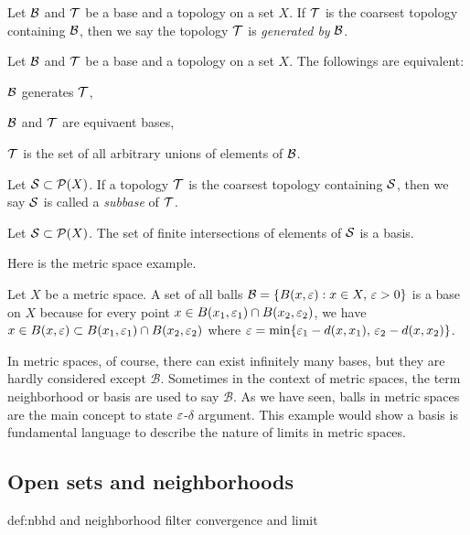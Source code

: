 \documentclass{../crs}
\begin{document}
\begin{defn}
Let $\mathcal{B}$ and $\mathcal{T}$ be a base and a topology on a set $X$.
If $\mathcal{T}$ is the coarsest topology containing $\mathcal{B}$, then we say the topology $\mathcal{T}$ is \emph{generated by} $\mathcal{B}$.
\end{defn}
\begin{thm}
Let $\mathcal{B}$ and $\mathcal{T}$ be a base and a topology on a set $X$.
The followings are equivalent:
\begin{cond}
\item $\mathcal{B}$ generates $\mathcal{T}$,
\item $\mathcal{B}$ and $\mathcal{T}$ are equivaent bases,
\item $\mathcal{T}$ is the set of all arbitrary unions of elements of $\mathcal{B}$.
\end{cond}
\end{thm}

\begin{defn}
Let $\mathcal{S}\subset\mathcal{P}(X)$.
If a topology $\mathcal{T}$ is the coarsest topology containing $\mathcal{S}$, then we say $\mathcal{S}$ is called a \emph{subbase} of $\mathcal{T}$.
\end{defn}
\begin{prop}
Let $\mathcal{S}\subset\mathcal{P}(X)$.
The set of finite intersections of elements of $\mathcal{S}$ is a basis.
\end{prop}

Here is the metric space example.
\begin{ex}
Let $X$ be a metric space.
A set of all balls $\mathcal{B}=\{B(x,\varepsilon):x\in X,\,\varepsilon>0\}$ is a base on $X$ because for every point $x\in B(x_1,\varepsilon_1)\cap B(x_2,\varepsilon_2)$, we have $x\in B(x,\varepsilon)\subset B(x_1,\varepsilon_1)\cap B(x_2,\varepsilon_2)$ where $\varepsilon=\min\{\varepsilon_1-d(x,x_1),\,\varepsilon_2-d(x,x_2)\}$.
\end{ex}

In metric spaces, of course, there can exist infinitely many bases, but they are hardly considered except $\mathcal{B}$.
Sometimes in the context of metric spaces, the term neighborhood or basis are used to say $\mathcal{B}$.
As we have seen, balls in metric spaces are the main concept to state $\varepsilon$-$\delta$ argument.
This example would show a basis is fundamental language to describe the nature of limits in metric spaces.










\subsection{Open sets and neighborhoods}
def:nbhd and neighborhood filter
convergence and limit
\end{document}
